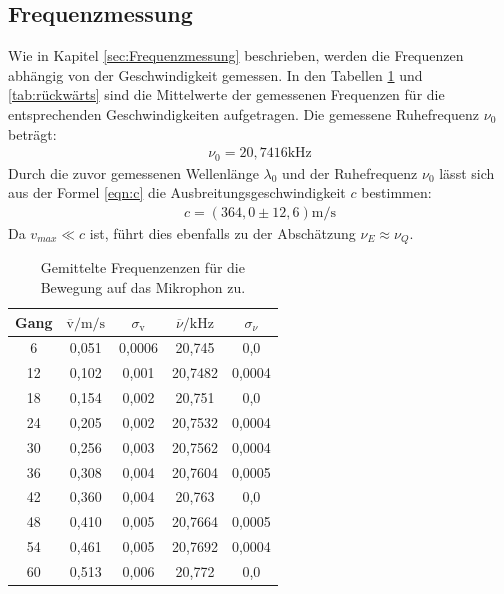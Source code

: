 \subsection{Frequenzmessung}
Wie in Kapitel \ref{sec:Frequenzmessung} beschrieben, werden die
Frequenzen abhängig von der Geschwindigkeit gemessen.
In den Tabellen \ref{tab:vorwärts} und \ref{tab:rückwärts} sind
die Mittelwerte der gemessenen Frequenzen
für die entsprechenden Geschwindigkeiten aufgetragen.
Die gemessene Ruhefrequenz $\nu_0$ beträgt:
\begin{align}
  \nu_0=20,7416\text{kHz}
\end{align}
Durch die zuvor gemessenen Wellenlänge $\lambda_0$
und der Ruhefrequenz $\nu_0$ lässt sich aus der Formel \eqref{eqn:c}
die Ausbreitungsgeschwindigkeit $c$ bestimmen:
\begin{align}
  c=(364,0\pm12,6)\si{\meter\per\second}
\end{align}
Da $v_{max}\ll c$ ist, führt dies ebenfalls zu der Abschätzung
$\nu_E \approx \nu_Q $.
\begin{table}
  \centering
  \caption{Gemittelte Frequenzenzen für die Bewegung auf das Mikrophon zu.}
  \label{tab:vorwärts}
  \begin{tabular}{c c c c c}
    \toprule
Gang &  $ \overline{\text{v}} / \si{\meter\per\second}$ & $\sigma_{\text{v}}$
 & $\overline{\nu}/\si{\kilo\hertz}$ & $\sigma_{\nu}$\\
    \midrule
    6  & 0,051  & 0,0006 & 20,745  & 0,0\\
    12 & 0,102  & 0,001  & 20,7482 & 0,0004\\
    18 & 0,154  & 0,002  & 20,751  & 0,0\\
    24 & 0,205  & 0,002  & 20,7532 & 0,0004\\
    30 & 0,256  & 0,003  & 20,7562 & 0,0004\\
    36 & 0,308  & 0,004  & 20,7604 & 0,0005\\
    42 & 0,360  & 0,004  & 20,763  & 0,0\\
    48 & 0,410  & 0,005  & 20,7664 & 0,0005\\
    54 & 0,461  & 0,005  & 20,7692 & 0,0004\\
    60 & 0,513  & 0,006  & 20,772  & 0,0\\
    \bottomrule
  \end{tabular}
\end{table}

